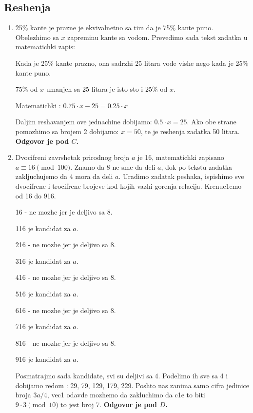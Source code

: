 \documentclass[a4paper,12pt]{article}
\begin{document}
\newpage

\subsection{Reshenja}
\begin{enumerate}[1.]

\item 25\% kante je prazne je ekvivalnetno sa tim da je 75\% kante puno. Obelezhimo sa $x$ zapreminu kante sa vodom. Prevedimo sada tekst zadatka u matematichki zapis:
\par Kada je 25\% kante prazno, ona sadrzhi 25 litara vode vishe nego kada je 25\% kante puno.
\par 75\% od $x$ umanjen sa 25 litara je isto sto i 25\% od $x$.
\par Matematichki : $ 0.75 \cdot x - 25 = 0.25 \cdot x$
\par Daljim reshavanjem ove jednachine dobijamo: $ 0.5 \cdot x = 25$. Ako obe strane pomozhimo sa brojem 2 dobijamo: $x = 50$, te je reshenja zadatka 50 litara. \textbf{Odgovor je pod $C$.}

\item Dvocifreni zavrshetak prirodnog broja $a$ je 16, matematichki zapisano $ a \equiv 16 \pmod{100}$. Znamo da 8 ne sme da deli $a$, dok po tekstu zadatka zakljuchujemo da 4 mora da deli $a$. Uradimo zadatak peshaka, ispishimo sve dvocifrene i trocifrene brojeve kod kojih vazhi gorenja relacija. Krenuc1emo od 16 do 916.
\par 16 - ne mozhe jer je deljivo sa 8.
\par 116 je kandidat za $a$.
\par 216 - ne mozhe jer je deljivo sa 8.
\par 316 je kandidat za $a$.
\par 416 - ne mozhe jer je deljivo sa 8.
\par 516 je kandidat za $a$.
\par 616 - ne mozhe jer je deljivo sa 8.
\par 716 je kandidat za $a$.
\par 816 - ne mozhe jer je deljivo sa 8.
\par 916 je kandidat za $a$.
\par Posmatrajmo sada kandidate, svi su deljivi sa 4. Podelimo ih sve sa 4 i dobijamo redom : 29, 79, 129, 179, 229. Poshto nas zanima samo cifra jedinice broja $3a/4$, vec1 odavde mozhemo da zakluchimo da c1e to biti $9 \cdot 3 \pmod{10}$ to jest broj 7. \textbf{Odgovor je pod $D$.}


\end{enumerate}
\end{document}
